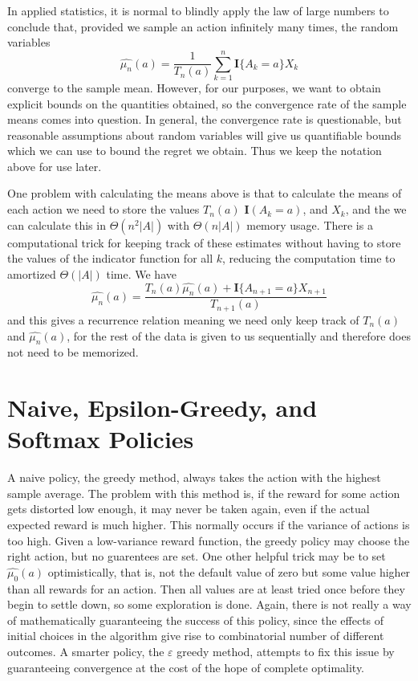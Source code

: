 In applied statistics, it is normal to blindly apply the law of large numbers to conclude that, provided we sample an action infinitely many times, the random variables
%
\[ \widehat{\mu_n}(a) = \frac{1}{T_n(a)} \sum_{k = 1}^n \mathbf{I} \{A_k = a \} X_k \]
%
converge to the sample mean. However, for our purposes, we want to obtain explicit bounds on the quantities obtained, so the convergence rate of the sample means comes into question. In general, the convergence rate is questionable, but reasonable assumptions about random variables will give us quantifiable bounds which we can use to bound the regret we obtain. Thus we keep the notation above for use later.

One problem with calculating the means above is that to calculate the means of each action we need to store the values $T_n(a)$ $\mathbf{I}(A_k = a)$, and $X_k$, and the we can calculate this in $\Theta(n^2 |A|)$ with $\Theta(n|A|)$ memory usage. There is a computational trick for keeping track of these estimates without having to store the values of the indicator function for all $k$, reducing the computation time to amortized $\Theta(|A|)$ time. We have
%
\[ \widehat{\mu_n}(a) = \frac{T_n(a) \widehat{\mu_n}(a) + \mathbf{I} \{ A_{n+1} = a \} X_{n+1}}{T_{n+1}(a)} \]
%
and this gives a recurrence relation meaning we need only keep track of $T_n(a)$ and $\widehat{\mu_n}(a)$, for the rest of the data is given to us sequentially and therefore does not need to be memorized.

\section{Naive, Epsilon-Greedy, and Softmax Policies}

A naive policy, the greedy method, always takes the action with the highest sample average. The problem with this method is, if the reward for some action gets distorted low enough, it may never be taken again, even if the actual expected reward is much higher. This normally occurs if the variance of actions is too high. Given a low-variance reward function, the greedy policy may choose the right action, but no guarentees are set. One other helpful trick may be to set $\widehat{\mu_0}(a)$ optimistically, that is, not the default value of zero but some value higher than all rewards for an action. Then all values are at least tried once before they begin to settle down, so some exploration is done. Again, there is not really a way of mathematically guaranteeing the success of this policy, since the effects of initial choices in the algorithm give rise to combinatorial number of different outcomes. A smarter policy, the $\varepsilon$ greedy method, attempts to fix this issue by guaranteeing convergence at the cost of the hope of complete optimality.

